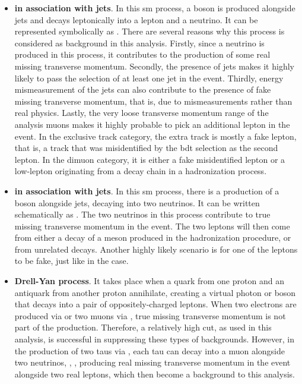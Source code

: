 \begin{itemize}
\item \textbf{\PW in association with jets}. In this \gls{sm} process, a \PW boson is produced alongside jets and decays leptonically into a lepton and a neutrino. It can be represented symbolically as \wjets. There are several reasons why this process is considered as background in this analysis. Firstly, since a neutrino is produced in this process, it contributes to the production of some real missing transverse momentum. Secondly, the presence of jets makes it highly likely to pass the selection of at least one jet in the event. Thirdly, energy mismeasurement of the jets can also contribute to the presence of fake missing transverse momentum, that is, \MET due to mismeasurements rather than real physics. Lastly, the very loose transverse momentum \pt range of the analysis muons makes it highly probable to pick an additional lepton in the event. In the exclusive track category, the extra track is mostly a fake lepton, that is, a track that was misidentified by the \gls{bdt} selection as the second lepton. In the dimuon category, it is either a fake misidentified lepton or a low-\pt lepton originating from a decay chain in a hadronization process.

\item \textbf{\PZ in association with jets}. In this \gls{sm} process, there is a production of a \PZ boson alongside jets, decaying into two neutrinos. It can be written schematically as \mbox{\zjets}. The two neutrinos in this process contribute to true missing transverse momentum in the event. The two leptons will then come from either a decay of a meson produced in the hadronization procedure, or from unrelated decays. Another highly likely scenario is for one of the leptons to be fake, just like in the \wjets case.

\item \textbf{Drell-Yan process}. It takes place when a quark from one proton and an antiquark from another proton annihilate, creating a virtual photon or \PZst boson that decays into a pair of oppositely-charged leptons. When two electrons are produced via \zee or two muons via \zmm, true missing transverse momentum is not part of the production. Therefore, a relatively high \MET cut, as used in this analysis, is successful in suppressing these types of backgrounds. However, in the production of two taus via \ztautau, each tau can decay into a muon alongside two neutrinos, \ie, \tautomu, producing real missing transverse momentum in the event alongside two real leptons, which then become a background to this analysis.


\end{itemize}
